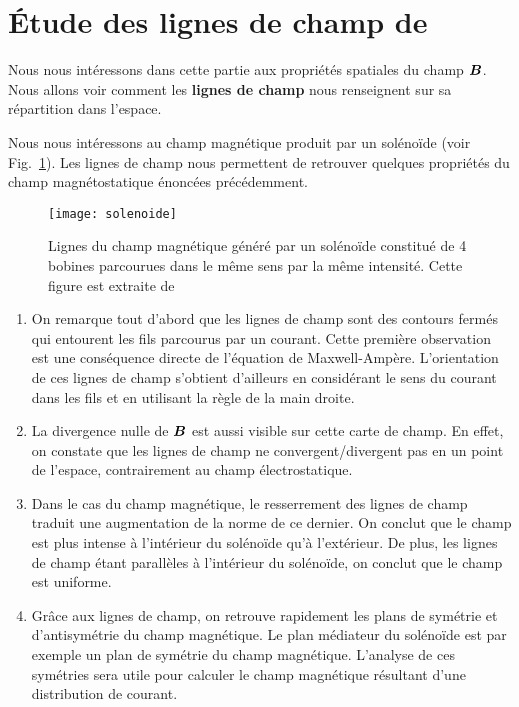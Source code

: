 \section{Étude des lignes de champ de \vecb}
Nous nous intéressons dans cette partie aux propriétés spatiales du champ $\vecb$.
Nous allons voir comment les \textbf{lignes de champ} nous renseignent sur sa répartition 
dans l'espace.

Nous nous intéressons au champ magnétique produit par un solénoïde 
(voir Fig.~\ref{fig:magneto_solenoide}).
Les lignes de champ nous permettent de retrouver quelques propriétés du champ 
magnétostatique énoncées précédemment.

\begin{figure}[htpb]
	\centering
	\texttt{[image: solenoide]}
	\caption{Lignes du champ magnétique généré par un solénoïde constitué de
		4 bobines parcourues dans le même sens par la même intensité.
		Cette figure est extraite de \cite{Gie1985}}%
	\label{fig:magneto_solenoide}
\end{figure}

\begin{enumerate}
	\item On remarque tout d'abord que les lignes de champ 
	  sont des contours fermés qui entourent les fils parcourus par un courant.
	  Cette première observation est une conséquence directe de l'équation
	  de Maxwell-Ampère. L'orientation de ces lignes de champ s'obtient
	  d'ailleurs en considérant le sens du courant dans les fils et en utilisant
	  la règle de la main droite.
      \item La divergence nulle de $\vecb$ est aussi visible sur cette carte de 
	champ. En effet, on constate que les lignes de champ ne convergent/divergent
	pas en un point de l'espace, contrairement au champ électrostatique.
      \item Dans le cas du champ magnétique, le resserrement des lignes de champ
	traduit une augmentation de la norme de ce dernier. On conclut que le champ
	est plus intense à l'intérieur du solénoïde qu'à l'extérieur. De plus, les
	lignes de champ étant parallèles à l'intérieur du solénoïde, on conclut que
	le champ est uniforme.
      \item Grâce aux lignes de champ, on retrouve rapidement les plans de 
	  symétrie et d'antisymétrie du champ magnétique. Le plan médiateur 
	  du solénoïde est par exemple un plan de symétrie du champ magnétique. 
          L'analyse de ces symétries sera utile pour calculer le champ
          magnétique résultant d'une distribution de courant.
\end{enumerate}

